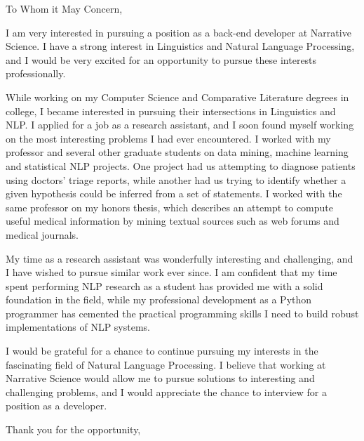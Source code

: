
\signature{Walter Askew\\
1341 N Campbell\\
Chicago, IL 60622}

\begin{letter}{}


\opening{To Whom it May Concern,}
  
I am very interested in pursuing a position as a back-end
developer at Narrative Science.
I have a strong interest in Linguistics and Natural Language
Processing, and I would be very excited for an opportunity to
pursue these interests professionally.

While working on my Computer Science and Comparative Literature
degrees in college, I became interested in pursuing their intersections
in Linguistics and NLP.
I applied for a job as a research assistant, and I soon found myself
working on the most interesting problems I had ever encountered. 
I worked with my professor and several other graduate students on data
mining, machine learning and statistical NLP projects.
One project had us attempting to diagnose patients using doctors'
triage reports, while another had us trying to identify whether a
given hypothesis could be inferred from a set of statements.
I worked with the same professor on my honors thesis, which describes
an attempt to compute useful medical information by mining textual
sources such as  web forums and medical journals.

My time as a research assistant was wonderfully interesting and
challenging, and I have wished to pursue similar work ever since.
I am confident that my time spent performing NLP research as a student
has provided me with a solid foundation in the field, while my
professional development as a Python programmer has cemented the
practical programming skills I need to build robust implementations of
NLP systems. 

I would be grateful for a chance to
continue pursuing my interests in the fascinating field of Natural
Language Processing. 
I believe that working at Narrative Science would allow me to pursue
solutions to interesting and challenging problems, and I would
appreciate the chance to interview for a position as a developer.

\closing{Thank you for the opportunity,}
\end{letter}

